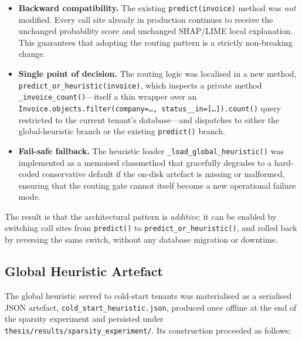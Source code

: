 \begin{itemize}
    \item \textbf{Backward compatibility.} The existing
    \texttt{predict(invoice)} method was \emph{not} modified. Every call
    site already in production continues to receive the unchanged
    probability score and unchanged SHAP/LIME local explanation. This
    guarantees that adopting the routing pattern is a strictly non-breaking
    change.
    \item \textbf{Single point of decision.} The routing logic was
    localised in a new method, \texttt{predict\_or\_heuristic(invoice)},
    which inspects a private method \texttt{\_invoice\_count()}---itself a
    thin wrapper over an
    \texttt{Invoice.objects.filter(company=\ldots, status\_\_in=[\ldots]).count()}
    query restricted to the current tenant's database---and dispatches to
    either the global-heuristic branch or the existing \texttt{predict()}
    branch.
    \item \textbf{Fail-safe fallback.} The heuristic loader
    \texttt{\_load\_global\_heuristic()} was implemented as a memoised
    classmethod that gracefully degrades to a hard-coded conservative
    default if the on-disk artefact is missing or malformed, ensuring that
    the routing gate cannot itself become a new operational failure mode.
\end{itemize}

The result is that the architectural pattern is \emph{additive}: it can be
enabled by switching call sites from \texttt{predict()} to
\texttt{predict\_or\_heuristic()}, and rolled back by reversing the same
switch, without any database migration or downtime.

\subsection{Global Heuristic Artefact}
\label{subsec:heuristic-artifact}

The global heuristic served to cold-start tenants was materialised as a
serialised JSON artefact, \texttt{cold\_start\_heuristic.json}, produced
once offline at the end of the sparsity experiment and persisted under
\texttt{thesis/results/sparsity\_experiment/}. Its construction proceeded
as follows:

